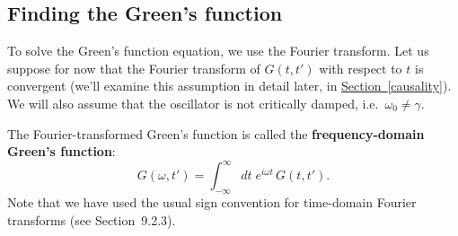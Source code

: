 \documentclass[10pt,a4paper]{article}
\begin{document}
\subsection{Finding the Green's function}
\label{finding-the-greens-function}

To solve the Green's function equation, we use the Fourier
transform. Let us suppose for now that the Fourier transform of
$G(t,t')$ with respect to $t$ is convergent (we'll examine this
assumption in detail later, in
\hyperref[causality]{Section~\ref{causality}}). We will also assume
that the oscillator is not critically damped, i.e.~$\omega_0 \ne
\gamma$.

The Fourier-transformed Green's function is called the
\textbf{frequency-domain Green's function}:
\begin{equation}
  G(\omega, t') = \int_{-\infty}^\infty dt \; e^{i\omega t}\, G(t,t').
\end{equation}
Note that we have used the usual sign convention for time-domain
Fourier transforms (see Section~9.2.3).
\end{document}
